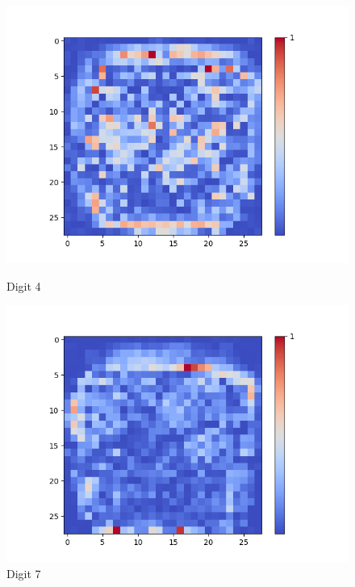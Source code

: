 \begin{figure}[H]
\begin{minipage}[b]{0.19\textwidth}
		\includegraphics[width=\textwidth]{Sigmoid(NO-Hidden)/Layer0-Neuron-4.png}
		\caption{Digit 4}
	\end{minipage}
	\begin{minipage}[b]{0.19\textwidth}
		\includegraphics[width=\textwidth]{Sigmoid(NO-Hidden)/Layer0-Neuron-7.png}
		\caption{Digit 7}
	\end{minipage}
	\begin{minipage}[b]{0.19\textwidth}

\end{minipage}
\end{figure}
